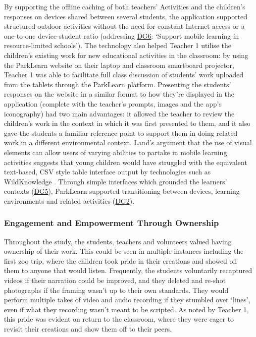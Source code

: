 By supporting the offline caching of both teachers’ Activities and the children’s responses on devices shared between several students, the application supported structured outdoor activities without the need for constant Internet access or a one-to-one device-student ratio (addressing \hyperref[DG6]{DG6}: `Support mobile learning in resource-limited schools'). The technology also helped Teacher 1 utilise the children’s existing work for new educational activities in the classroom: by using the ParkLearn website on their laptop and classroom smartboard projector, Teacher 1 was able to facilitate full class discussion of students’ work uploaded from the tablets through the ParkLearn platform. Presenting the students’ responses on the website in a similar format to how they’re displayed in the application (complete with the teacher’s prompts, images and the app’s iconography) had two main advantages: it allowed the teacher to review the children’s work in the context in which it was first presented to them, and it also gave the students a familiar reference point to support them in doing related work in a different environmental context. Land’s argument that the use of visual elements can allow users of varying abilities to partake in mobile learning activities \citep{Land2015} suggests that young children would have struggled with the equivalent text-based, CSV style table interface output by technologies such as WildKnowledge \citep{WildKnowledge2015}. Through simple interfaces which grounded the learners' contexts (\hyperref[DG5]{DG5}), ParkLearn supported transitioning between devices, learning environments and related activities (\hyperref[DG2]{DG2}). 

\subsubsection{Engagement and Empowerment Through Ownership} 

Throughout the study, the students, teachers and volunteers valued having ownership of their work. This could be seen in multiple instances including the first zoo trip, where the children took pride in their creations and showed off them to anyone that would listen. Frequently, the students voluntarily recaptured videos if their narration could be improved, and they deleted and re-shot photographs if the framing wasn't up to their own standards. They would perform multiple takes of video and audio recording if they stumbled over `lines', even if what they recording wasn't meant to be scripted. As noted by Teacher 1, this pride was evident on return to the classroom, where they were eager to revisit their creations and show them off to their peers. 

